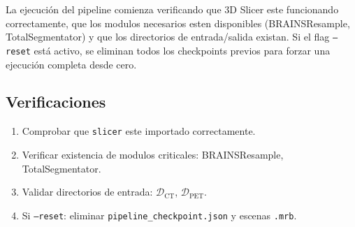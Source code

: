 \documentclass[12pt,a4paper]{article}
\begin{document}
La ejecución del pipeline comienza verificando que 3D Slicer este funcionando correctamente, que
los modulos necesarios esten disponibles (BRAINSResample, TotalSegmentator) y que los directorios
de entrada/salida existan. Si el flag \texttt{--reset} está activo, se eliminan todos los
checkpoints previos para forzar una ejecución completa desde cero.

\subsection{Verificaciones}

\begin{enumerate}
    \item Comprobar que \texttt{slicer} este importado correctamente.
    \item Verificar existencia de modulos criticales: BRAINSResample, TotalSegmentator.
    \item Validar directorios de entrada: $\mathcal{D}_{\text{CT}}$, $\mathcal{D}_{\text{PET}}$.
    \item Si \texttt{--reset}: eliminar \texttt{pipeline\_checkpoint.json} y escenas \texttt{.mrb}.
\end{enumerate}
\end{document}

